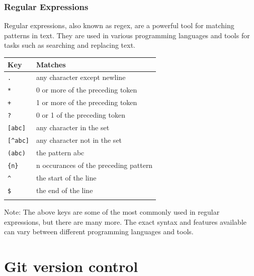 \documentclass{article}
\begin{document}
\subsubsection{Regular Expressions}

Regular expressions, also known as regex, are a powerful tool for matching patterns in text. They are used in various programming languages and tools for tasks such as searching and replacing text.

\begin{table}[H]
    \begin{tabular}{ll}
        \textbf{Key}       & \textbf{Matches}                      \\ \hline
        \lstinline|.|      & any character except newline          \\ \hline
        \lstinline|*|      & 0 or more of the preceding token      \\ \hline
        \lstinline|+|      & 1 or more of the preceding token      \\ \hline
        \lstinline|?|      & 0 or 1 of the preceding token         \\ \hline
        \lstinline|[abc]|  & any character in the set              \\ \hline
        \lstinline|[^abc]| & any character not in the set          \\ \hline
        \lstinline|(abc)|  & the pattern abc                       \\ \hline
        \lstinline|{n}|    & n occurances of the preceding pattern \\ \hline
        \lstinline|^|      & the start of the line                 \\ \hline
        \lstinline|$|      & the end of the line                   \\ \hline
    \end{tabular}
\end{table}

Note: The above keys are some of the most commonly used in regular expressions, but there are many more. The exact syntax and features available can vary between different programming languages and tools.
\newpage
\section{Git version control}
\end{document}
